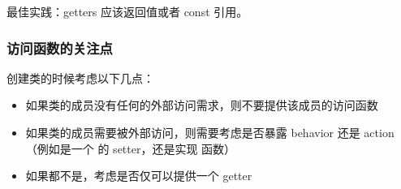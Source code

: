 \documentclass[../../LearnCpp.tex]{subfiles}
\begin{document}
最佳实践：getters 应该返回值或者 const 引用。

\subsubsection*{访问函数的关注点}

创建类的时候考虑以下几点：

\begin{itemize}
    \item 如果类的成员没有任何的外部访问需求，则不要提供该成员的访问函数
    \item 如果类的成员需要被外部访问，则需要考虑是否暴露 behavior 还是 action
          （例如是一个  的 setter，还是实现  函数）
    \item 如果都不是，考虑是否仅可以提供一个 getter
\end{itemize}
\end{document}
